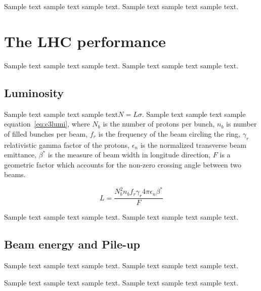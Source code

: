 \par Sample text sample text sample text. Sample text sample text sample text.

\section{The LHC performance}
\label{sec:lhcs2}
\par Sample text sample text sample text. Sample text sample text sample text.

\subsection{Luminosity}
\par Sample text sample text sample text$N=L\sigma$. Sample text sample text sample equation~\ref{eq:c3lumi}, where $N_{b}$ is the number of protons per bunch, $n_{b}$ is number of filled bunches per beam, $f_{r}$ is the frequency of the beam circling the ring, $\gamma_{r}$ relativistic gamma factor of the protons, $\epsilon_{n}$ is the normalized transverse beam emittance, $\beta^{*}$ is the measure of beam width in longitude direction, $F$ is a geometric factor which accounts for the non-zero crossing angle between two beams.

\begin{equation}
  L = \frac{N_{b}^{2}n_{b}f_{r}\gamma_{r}4\pi\epsilon_{n}\beta^{*}}{F}
  \label{eq:c3lumi}
\end{equation}

\par Sample text sample text sample text. Sample text sample text sample text.

\subsection{Beam energy and Pile-up}
\par Sample text sample text sample text. Sample text sample text sample text.

\par Sample text sample text sample text. Sample text sample text sample text.

